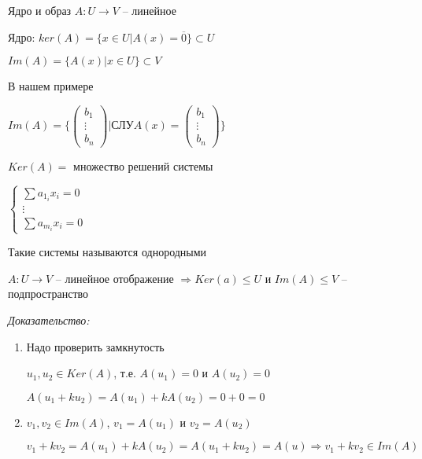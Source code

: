 \documentclass[12pt]{article}
\begin{document}
\begin{defin}{Ядро и образ}
    $A : U \rightarrow V$ -- линейное

    Ядро: $ker(A) = \{x \in U | A(x) = \overline{0} \} \subset U$

    $Im(A) = \{ A(x) | x \in U \} \subset V$

    \begin{Example}{}
        В нашем примере

        $Im(A) = \{ \left( \begin{gathered}
            b_1 \\
            \vdots \\
            b_n
        \end{gathered} \right) | \text{СЛУ} A(x) = \left( \begin{gathered}
            b_1 \\
            \vdots \\
            b_n
        \end{gathered} \right) \}$

        $Ker(A) = $ множество решений системы

        $\begin{cases}
            \sum a_{1_i}x_i = 0 \\
            \vdots \\
            \sum a_{m_i}x_i = 0
        \end{cases}$

        Такие системы называются однородными
    \end{Example}
\end{defin}

\begin{lem}{}
    $A : U \rightarrow V$ -- линейное отображение $\Rightarrow Ker(a) \leq U$ и $Im(A) \leq V$ -- подпространство
\end{lem}

\textit{Доказательство:}

\begin{enumerate}
    \item Надо проверить замкнутость

    $u_1, u_2 \in Ker(A)$, т.е. $A(u_1) = 0$ и $A(u_2) = 0$
    
    $A(u_1 + ku_2) = A(u_1) + kA(u_2) = 0 + 0 = 0$

    \item $v_1, v_2 \in Im(A)$, $v_1 = A(u_1)$ и $v_2 = A(u_2)$
    
    $v_1 + kv_2 = A(u_1) + kA(u_2) = A(u_1 + ku_2) = A(u) \Rightarrow v_1 + kv_2 \in Im(A)$
\end{enumerate}
\end{document}
